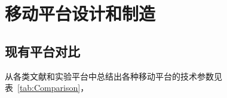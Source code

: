 \chapter{移动平台设计和制造}
\label{cha:Platform}

\section{现有平台对比}

从各类文献和实验平台中总结出各种移动平台的技术参数见表~\ref{tab:Comparison}，




